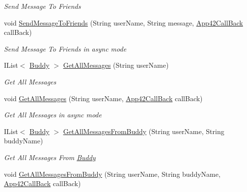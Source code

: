 \begin{DoxyCompactItemize}
\begin{DoxyCompactList}\small\item\em Send Message To Friends \end{DoxyCompactList}\item 
void \hyperlink{classcom_1_1shephertz_1_1app42_1_1paas_1_1sdk_1_1csharp_1_1buddy_1_1_buddy_service_aa70a3b64ae00e0ab188873d3ccd0ba28}{Send\+Message\+To\+Friends} (String user\+Name, String message, \hyperlink{interfacecom_1_1shephertz_1_1app42_1_1paas_1_1sdk_1_1csharp_1_1_app42_call_back}{App42\+Call\+Back} call\+Back)
\begin{DoxyCompactList}\small\item\em Send Message To Friends in async mode \end{DoxyCompactList}\item 
I\+List$<$ \hyperlink{classcom_1_1shephertz_1_1app42_1_1paas_1_1sdk_1_1csharp_1_1buddy_1_1_buddy}{Buddy} $>$ \hyperlink{classcom_1_1shephertz_1_1app42_1_1paas_1_1sdk_1_1csharp_1_1buddy_1_1_buddy_service_a84f44f883a7faf05c00aa324852223be}{Get\+All\+Messages} (String user\+Name)
\begin{DoxyCompactList}\small\item\em Get All Messages \end{DoxyCompactList}\item 
void \hyperlink{classcom_1_1shephertz_1_1app42_1_1paas_1_1sdk_1_1csharp_1_1buddy_1_1_buddy_service_a35b8447a9e8489d3b18897ce720f5f0b}{Get\+All\+Messages} (String user\+Name, \hyperlink{interfacecom_1_1shephertz_1_1app42_1_1paas_1_1sdk_1_1csharp_1_1_app42_call_back}{App42\+Call\+Back} call\+Back)
\begin{DoxyCompactList}\small\item\em Get All Messages in async mode \end{DoxyCompactList}\item 
I\+List$<$ \hyperlink{classcom_1_1shephertz_1_1app42_1_1paas_1_1sdk_1_1csharp_1_1buddy_1_1_buddy}{Buddy} $>$ \hyperlink{classcom_1_1shephertz_1_1app42_1_1paas_1_1sdk_1_1csharp_1_1buddy_1_1_buddy_service_ae708e496b377faee289aa328b769d893}{Get\+All\+Messages\+From\+Buddy} (String user\+Name, String buddy\+Name)
\begin{DoxyCompactList}\small\item\em Get All Messages From \hyperlink{classcom_1_1shephertz_1_1app42_1_1paas_1_1sdk_1_1csharp_1_1buddy_1_1_buddy}{Buddy} \end{DoxyCompactList}\item 
void \hyperlink{classcom_1_1shephertz_1_1app42_1_1paas_1_1sdk_1_1csharp_1_1buddy_1_1_buddy_service_af0dd01d74bcafd587c6de484fa2cde9e}{Get\+All\+Messages\+From\+Buddy} (String user\+Name, String buddy\+Name, \hyperlink{interfacecom_1_1shephertz_1_1app42_1_1paas_1_1sdk_1_1csharp_1_1_app42_call_back}{App42\+Call\+Back} call\+Back)

\end{DoxyCompactItemize}
